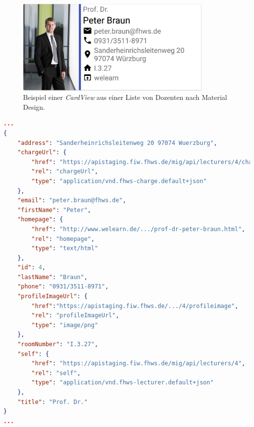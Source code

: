 \begin{figure}[H]
	\begin{center}
		\includegraphics[width=0.86\textwidth]{images/card.png}
		\caption{Beispiel einer \textit{CardView} aus einer Liste von Dozenten nach Material Design.}
		\label{fig:card}
	\end{center}
\end{figure}

\newpage

\begin{lstlisting}[label=lst:braun_json,
language=json,
firstnumber=1,
caption=Demo Daten eines Dozenten.]	
...			   
{
	"address": "Sanderheinrichsleitenweg 20 97074 Wuerzburg",
	"chargeUrl": {
		"href": "https://apistaging.fiw.fhws.de/mig/api/lecturers/4/charges",
		"rel": "chargeUrl",
		"type": "application/vnd.fhws-charge.default+json"
	},
	"email": "peter.braun@fhws.de",
	"firstName": "Peter",
	"homepage": {
		"href": "http://www.welearn.de/.../prof-dr-peter-braun.html",
		"rel": "homepage",
		"type": "text/html"
	},
	"id": 4,
	"lastName": "Braun",
	"phone": "0931/3511-8971",
	"profileImageUrl": {
		"href":"https://apistaging.fiw.fhws.de/.../4/profileimage",
		"rel": "profileImageUrl",
		"type": "image/png"
	},
	"roomNumber": "I.3.27",
	"self": {
		"href": "https://apistaging.fiw.fhws.de/mig/api/lecturers/4",
		"rel": "self",
		"type": "application/vnd.fhws-lecturer.default+json"
	},
	"title": "Prof. Dr."
}
...
\end{lstlisting}

